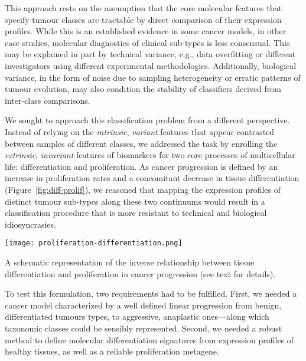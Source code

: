 
This approach rests on the assumption that the core molecular features that
specify tumour classes are tractable by direct comparison of their expression
profiles.  While this is an established evidence in some cancer
models,\cite{haibe-kains_three-gene_2012,markert_molecular_2011} in other case
studies, molecular diagnostics of clinical sub-types is less
consensual.\cite{travis_new_2013,nikiforov_molecular_2011} This may be explained
in part by technical variance, e.g., data overfitting or different investigators
using different experimental methodologies.\cite{weigelt_challenges_2012}
Additionally, biological variance, in the form of noise due to sampling
heterogeneity or erratic patterns of tumour evolution, may also condition the
stability of classifiers derived from inter-class comparisons.

We sought to approach this classification problem from a different perspective.
Instead of relying on the \emph{intrinsic}, \emph{variant} features that appear
contrasted between samples of different classes, we addressed the task by
enrolling the \emph{extrinsic}, \emph{invariant} features of biomarkers for two
core processes of multicellular life: differentiation and proliferation.  As
cancer progression is defined by an increase in proliferation rates and a
concomitant decrease in tissue differentiation (Figure~\ref{fig:diff-prolif}),
we reasoned that mapping the expression profiles of distinct tumour sub-types
along these two continuums would result in a classification procedure that is
more resistant to technical and biological idiosyncrasies.

\begin{marginfigure}%
  \begin{center}
    \texttt{[image: proliferation-differentiation.png]}
    \caption[Differentiation proliferation in cancer]{A schematic representation
      of the inverse relationship between tissue differentiation and
      proliferation in cancer progression (see text for
      details).}\label{fig:diff-prolif}%
  \end{center}
\end{marginfigure}%

To test this formulation, two requirements had to be fulfilled.  First, we
needed a cancer model characterized by a well defined linear progression from
benign, differentiated tumours types, to aggressive, anaplastic ones---along
which taxonomic classes could be sensibly represented.  Second, we needed a
robust method to define molecular differentiation signatures from expression
profiles of healthy tissues, as well as a reliable proliferation metagene.


